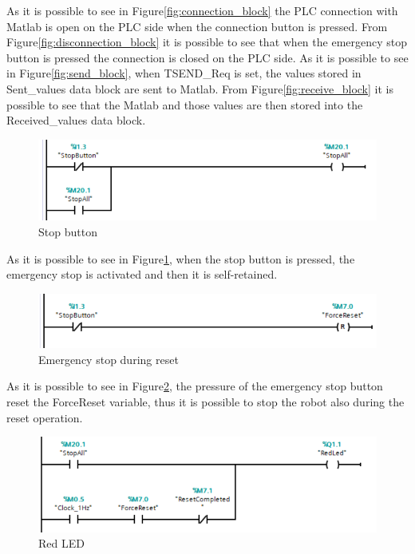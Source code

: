 As it is possible to see in Figure\ref{fig:connection_block} the PLC connection with Matlab is open on the PLC side when the connection button is pressed.
From Figure\ref{fig:disconnection_block} it is possible to see that when the emergency stop button is pressed the connection is closed on the PLC side.
As it is possible to see in Figure\ref{fig:send_block}, when TSEND\_Req is set, the values stored in Sent\_values data block are sent to Matlab.
From Figure\ref{fig:receive_block} it is possible to see that the Matlab and those values are then stored into the Received\_values data block.

\begin{figure}[!h]
\begin{center}
\includegraphics[width=0.8\linewidth]{capitolo3/figure/stop_button.PNG}
\caption{Stop button}
\label{fig:stop_button}
\end{center}
\end{figure}

As it is possible to see in Figure\ref{fig:stop_button}, when the stop button is pressed, the emergency stop is activated and then it is self-retained.

\begin{figure}[!h]
\begin{center}
\includegraphics[width=0.8\linewidth]{capitolo3/figure/stop_reset.PNG}
\caption{Emergency stop during reset}
\label{fig:stop_reset}
\end{center}
\end{figure}

As it is possible to see in Figure\ref{fig:stop_reset}, the pressure of the emergency stop button reset the ForceReset variable, thus it is possible to stop the robot also during the reset operation.

\begin{figure}[!h]
\begin{center}
\includegraphics[width=0.8\linewidth]{capitolo3/figure/red_led_stop.PNG}
\caption{Red LED}
\label{fig:red_led}
\end{center}
\end{figure}

